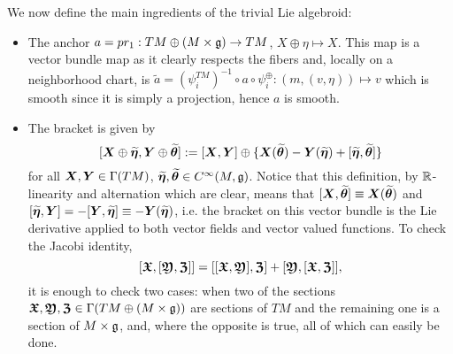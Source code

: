 We now define the main ingredients of the trivial Lie algebroid:
    \begin{itemize}
    \item The anchor $a = pr_1: TM \oplus (M \times \mathfrak{g}) \to TM$, $X \oplus \eta \mapsto X$. This map is a vector bundle map as it clearly respects the fibers and, locally on a neighborhood chart, is $\tilde a = (\psi^{TM}_i)^{-1} \circ a \circ \psi^{\oplus}_i: (m, (v, \eta)) \mapsto v$ which is smooth since it is simply a projection, hence $a$ is smooth.
    
    \item The bracket is given by 
    \[
        [\bm{X} \oplus \widetilde{\bm{\eta}}, \bm{Y} \oplus \widetilde{\bm{\theta}}] := [\bm{X}, \bm{Y}] \oplus \{\bm{X}(\widetilde{\bm{\theta}}) - \bm{Y}(\widetilde{\bm{\eta}}) + [\widetilde{\bm{\eta}}, \widetilde{\bm{\theta}}]\}
    \]
    for all $\bm{X}, \bm{Y} \in \Gamma(TM)$, $\widetilde{\bm{\eta}}, \widetilde{\bm{\theta}} \in C^\infty(M, \mathfrak{g})$. %
    Notice that this definition, by $\mathbb{R}$-linearity and alternation which are clear, means that $[\bm{X}, \widetilde{\bm{\theta}}] \equiv \bm{X}(\widetilde{\bm{\theta}})$ and $[\widetilde{\bm{\eta}}, \bm{Y}] = - [\bm{Y}, \widetilde{\bm{\eta}}] \equiv -\bm{Y}(\widetilde{\bm{\eta}})$, i.e. the bracket on this vector bundle is the Lie derivative applied to both vector fields and vector valued functions. %
    To check the Jacobi identity,
    \[ [\bm{\mathfrak{X}}, [\bm{\mathfrak{Y}}, \bm{\mathfrak{Z}}]] = [[\bm{\mathfrak{X}}, \bm{\mathfrak{Y}}], \bm{\mathfrak{Z}}] + [\bm{\mathfrak{Y}}, [\bm{\mathfrak{X}}, \bm{\mathfrak{Z}}]], \] it is enough to check two cases: when two of the sections $\bm{\mathfrak{X}}, \bm{\mathfrak{Y}}, \bm{\mathfrak{Z}} \in \Gamma(TM \oplus (M \times \mathfrak{g}))$ are sections of $TM$ and the remaining one is a section of $M \times \mathfrak{g}$, and, where the opposite is true, all of which can easily be done.
    \end{itemize}

